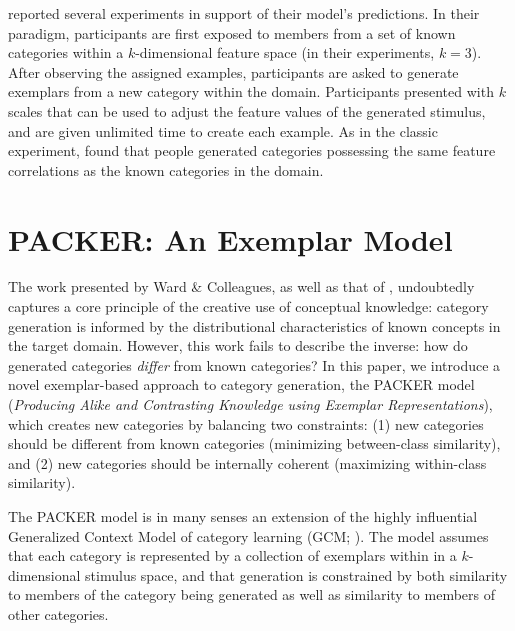 \documentclass[10pt,letterpaper]{article}
\begin{document}
\citet{jern2013probabilistic} reported several experiments in support of their model's predictions. In their paradigm, participants are first exposed to members from a set of known categories within a $k$-dimensional feature space (in their experiments, $k=3$). After observing the assigned examples, participants are asked to generate exemplars from a new category within the domain. Participants presented with $k$ scales that can be used to adjust the feature values of the generated stimulus, and are given unlimited time to create each example. As in the classic \cite{ward1994structured} experiment, \citet{jern2013probabilistic} found that people generated categories possessing the same feature correlations as the known categories in the domain.


\section{PACKER: An Exemplar Model}

The work presented by Ward \& Colleagues, as well as that of \citet{jern2013probabilistic}, undoubtedly captures a core principle of the creative use of conceptual knowledge: category generation is informed by the distributional characteristics of known concepts in the target domain. However, this work fails to describe the inverse: how do generated categories \textit{differ} from known categories? In this paper, we introduce a novel exemplar-based approach to category generation, the PACKER model (\textit{Producing Alike and Contrasting Knowledge using Exemplar Representations}), which creates new categories by balancing two constraints: (1) new categories should be different from known categories (minimizing between-class similarity), and (2) new categories should be internally coherent (maximizing within-class similarity). 


The PACKER model is in many senses an extension of the highly influential Generalized Context Model of category learning (GCM; \citealp{nosofsky1984choice}). The model assumes that each category is represented by a collection of exemplars within in a $k$-dimensional stimulus space, and that generation is constrained by both similarity to members of the category being generated as well as similarity to members of other categories. 
\end{document}
